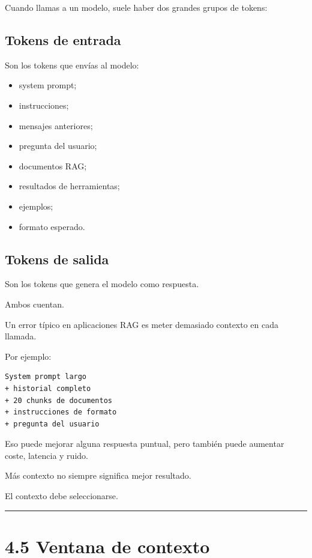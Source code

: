 Cuando llamas a un modelo, suele haber dos grandes grupos de tokens:

\subsection{Tokens de entrada}\label{tokens-de-entrada}

Son los tokens que envías al modelo:

\begin{itemize}
\tightlist
\item
  system prompt;
\item
  instrucciones;
\item
  mensajes anteriores;
\item
  pregunta del usuario;
\item
  documentos RAG;
\item
  resultados de herramientas;
\item
  ejemplos;
\item
  formato esperado.
\end{itemize}

\subsection{Tokens de salida}\label{tokens-de-salida}

Son los tokens que genera el modelo como respuesta.

Ambos cuentan.

Un error típico en aplicaciones RAG es meter demasiado contexto en cada
llamada.

Por ejemplo:

\begin{lstlisting}
System prompt largo
+ historial completo
+ 20 chunks de documentos
+ instrucciones de formato
+ pregunta del usuario
\end{lstlisting}

Eso puede mejorar alguna respuesta puntual, pero también puede aumentar
coste, latencia y ruido.

Más contexto no siempre significa mejor resultado.

El contexto debe seleccionarse.

\begin{center}\rule{0.5\linewidth}{0.5pt}\end{center}

\section{4.5 Ventana de contexto}\label{ventana-de-contexto}

